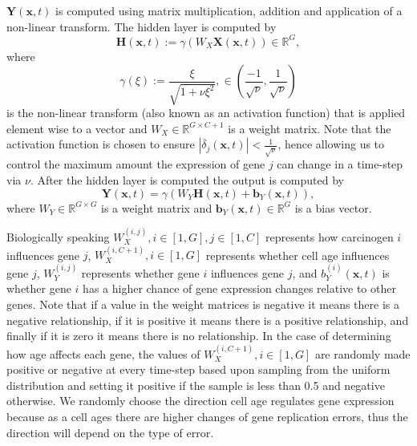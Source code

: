 \documentclass[\main/thesis.tex]{subfiles}
\begin{document}
$\boldsymbol{Y}(\boldsymbol{x}, t)$ is computed using matrix multiplication, addition and 
application of a non-linear transform. The hidden layer is computed by
\begin{equation}
\boldsymbol{H}(\boldsymbol{x}, t) {:=} \gamma(W_{X} \boldsymbol{X}(\boldsymbol{x}, t))
{\in} \mathbb{R}^{G},
\label{eq:geneExprNN_HiddenLayer}
\end{equation}
where
\begin{equation}
\gamma(\xi) {:=} \frac{\xi}
                      {\sqrt{1 {+} \nu \xi^2}},
{\in} \left(
        \frac{\minus 1}
             {\sqrt{\nu}},
        \frac{1}
             {\sqrt{\nu}}
      \right) 
\label{eq:geneExprNN_ActivationFunc}
\end{equation}
is the non-linear transform (also known as an activation function) that is applied element wise to a vector and $W_{X} {\in} \mathbb{R}^{G {\times} C {+} 1}$ is a weight matrix. Note that the activation function is chosen to ensure $|\overline{\delta}_j(\boldsymbol{x}, t)| < \frac{1}{\sqrt{\nu}}$, hence allowing us to control the maximum amount the expression of gene $j$ can change in a time-step via $\nu$. After the hidden layer is computed the output is computed by
\begin{equation}
\boldsymbol{Y}(\boldsymbol{x}, t) {=} \gamma(W_{Y} \boldsymbol{H}(\boldsymbol{x}, t) {+} \boldsymbol{b}_{Y}(\boldsymbol{x}, t)), 
\label{eq:geneExprNN_OutputLayer}
\end{equation}
where $W_{Y} {\in} \mathbb{R}^{G {\times} G}$ is a weight matrix and
$\boldsymbol{b}_{Y}(\boldsymbol{x}, t) {\in} \mathbb{R}^G$ is a bias vector. 

Biologically speaking $W_{X}^{(i,j)}, i {\in} [1, G], j {\in} [1, C]$ represents how 
carcinogen $i$ influences gene $j$, $W_{X}^{(i,C {+} 1)}, i {\in} [1, G]$ represents whether cell age influences gene $j$, $W_{Y}^{(i,j)}$ represents whether gene $i$ influences 
gene $j$, and $b_{Y}^{(i)}(\boldsymbol{x}, t)$ is whether gene $i$ has a 
higher chance of gene expression changes relative to other genes. Note that if a 
value in the weight matrices is negative it means there is a negative relationship, 
if it is positive it means there is a positive relationship, and finally if it is 
zero it means there is no relationship. In the case of determining how age affects 
each gene, the values of $W_{X}^{(i,C {+} 1)}, i {\in} [1, G]$ are randomly made 
positive or negative at every time-step based upon sampling from the uniform distribution and setting it 
positive if the sample is less than 0.5 and negative otherwise. We randomly choose the direction cell age regulates gene expression because as a cell ages there are higher changes of gene replication errors, thus the direction will depend on the type of error.
\end{document}
